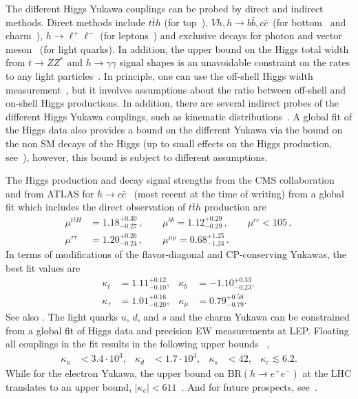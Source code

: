 \documentclass[../report.tex]{subfiles}
\begin{document}
The different Higgs Yukawa couplings can be probed by direct and
indirect methods.  Direct methods include $t\bar{t}h$ (for
top~\cite{Aaboud:2017jvq,Aaboud:2018urx,Sirunyan:2018shy}), $Vh, h\to
b\bar{b}, c\bar{c} $~(for
bottom~\cite{Aaboud:2018zhk,Sirunyan:2018kst} and
charm~\cite{Aaboud:2018fhh}), $h\to \ell^+ \ell^-$ (for
leptons~\cite{Aaboud:2018pen,Aaboud:2017ojs,Aad:2015vsa}) and
exclusive decays for photon and vector
meson~\cite{Aad:2015sda,Khachatryan:2015lga,Aaboud:2018txb,Aaboud:2017xnb}
(for light quarks).  In addition, the upper bound on the Higgs total
width from $t\to ZZ^*$ and $h\to\gamma\gamma$ signal shapes is an
unavoidable constraint on the rates to any light
particles~\cite{Perez:2015aoa}.  In principle, one can use the
off-shell Higgs width measurement~\cite{Englert:2014aca,Englert:2014ffa},
but it involves assumptions about the ratio between off-shell and
on-shell Higgs productions.  In addition, there are several indirect
probes of the different Higgs Yukawa couplings, such as kinematic
distributions~\cite{Soreq:2016rae,Bishara:2016jga}.  A global fit of
the Higgs data also provides a bound on the different Yukawa via the
bound on the non SM decays of the Higgs (up to small effects on the
Higgs production,
see~\cite{Delaunay:2013pja,Kagan:2014ila,Perez:2015aoa}), however,
this bound is subject to different assumptions.




The Higgs production and decay signal strengths from the CMS collaboration~\cite{Sirunyan:2018koj} and from ATLAS for $h\to c\bar{c}$~\cite{Aaboud:2018fhh} (most recent at the time of writing) from a global fit which includes the direct observation of $t\bar t h$ production are
\begin{align}
    \mu^{ttH} &= 1.18^{+0.30}_{-0.27}\, ,\qquad \mu^{bb}=1.12^{+0.29}_{-0.29}\, , \qquad
    \mu^{cc} < 105 \, , \nonumber\\ \mu^{\tau\tau} &= 1.20^{+0.26}_{-0.24}\, ,\qquad   \mu^{\mu\mu}=0.68^{+1.25}_{-1.24}\,.
\end{align}
In terms of modifications of the flavor-diagonal and CP-conserving Yukawas,  the best fit values are
\begin{align}
\label{eq:kappalimits}
    \kappa_t &= 1.11^{+0.12}_{-0.10}, & \kappa_b &= -1.10^{+0.33}_{-0.23},\nonumber\\
    \kappa_\tau &= 1.01^{+0.16}_{-0.20}, & \kappa_\mu &= 0.79^{+0.58}_{-0.79}.
\end{align}
See also \cite{CMS-PAS-HIG-15-002,CMS-PAS-HIG-17-031}.
The light quarks $u$, $d$, and $s$ and the charm Yukawa can be constrained from a global fit of Higgs data and precision EW measurements at LEP. Floating all couplings in the fit results in the following upper bounds~ \cite{Perez:2015aoa,Kagan:2014ila},
\begin{align}
\kappa_u&<3.4 \cdot 10^{3},  &\kappa_d&<1.7 \cdot 10^3, &\kappa_s&< 42, & \kappa_c \lesssim 6.2\nonumber.
\end{align}
While for the electron Yukawa, the upper bound on $\mbox{BR}(h\to e^+e^-)$ at the LHC translates to an upper bound, $|\kappa_e|<611$~\cite{Khachatryan:2014aep,Altmannshofer:2015qra}. And for future prospects, see~\cite{Perez:2015lra,Brivio:2015fxa,Koenig:2015pha,Aad:2015sda,Bodwin:2014bpa,Bodwin:2013gca}.
\end{document}
